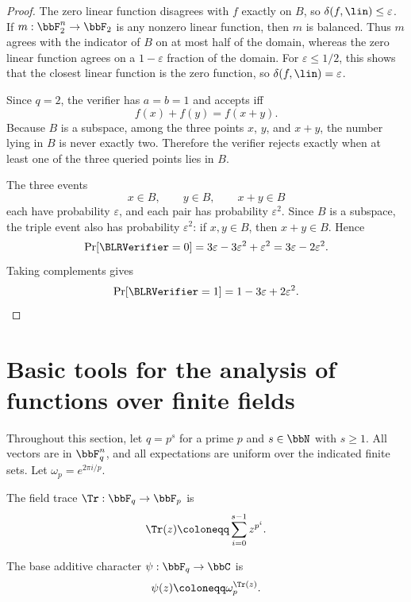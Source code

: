 \begin{proof}
The zero linear function disagrees with $f$ exactly on $B$, so
$\delta(f,\lin)\le\varepsilon$. If $m:\bbF_2^n\to\bbF_2$ is any nonzero linear function,
then $m$ is balanced. Thus $m$ agrees with the indicator of $B$ on at most half of the
domain, whereas the zero linear function agrees on a $1-\varepsilon$ fraction of the domain.
For $\varepsilon\le 1/2$, this shows that the closest linear function is the zero function,
so $\delta(f,\lin)=\varepsilon$.

Since $q=2$, the verifier has $a=b=1$ and accepts iff
\[
    f(x)+f(y)=f(x+y).
\]
Because $B$ is a subspace, among the three points $x$, $y$, and $x+y$, the number lying in
$B$ is never exactly two. Therefore the verifier rejects exactly when at least one of the
three queried points lies in $B$.

The three events
\[
    x\in B,\qquad y\in B,\qquad x+y\in B
\]
each have probability $\varepsilon$, and each pair has probability $\varepsilon^2$.
Since $B$ is a subspace, the triple event also has probability $\varepsilon^2$: if
$x,y\in B$, then $x+y\in B$. Hence
\[
    \Pr[\BLRVerifier=0]
    =
    3\varepsilon-3\varepsilon^2+\varepsilon^2
    =
    3\varepsilon-2\varepsilon^2.
\]
Taking complements gives
\[
    \Pr[\BLRVerifier=1]=1-3\varepsilon+2\varepsilon^2.
\]
\end{proof}


\section{Basic tools for the analysis of functions over finite fields}

Throughout this section, let $q=p^s$ for a prime $p$ and $s\in\bbN$ with $s\ge 1$.
All vectors are in $\bbF_q^n$, and all expectations are uniform over the indicated finite sets.
Let $\omega_p = e^{2\pi i/p}$.

\begin{definition}
\label{def:field-trace}
\leanok
The field trace $\Tr: \bbF_q \to \bbF_p$ is
\[
    \Tr(z) \coloneqq \sum_{i=0}^{s-1} z^{p^i}.
\]
\end{definition}

\begin{definition}
\label{def:base-character}
\leanok
The base additive character $\psi:\bbF_q\to\bbC$ is
\[
    \psi(z) \coloneqq \omega_p^{\Tr(z)}.
\]
\end{definition}

